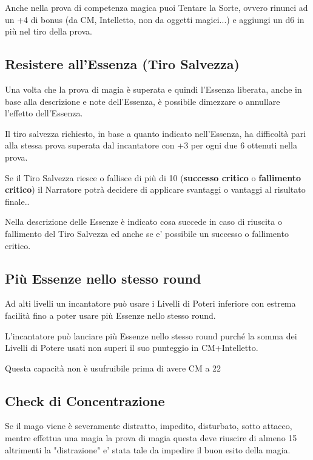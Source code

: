 \documentclass[a4paper,11pt,twoside,openany]{book}
\begin{document}
Anche nella prova di competenza magica puoi Tentare la Sorte, ovvero rinunci ad un +4 di bonus (da CM, Intelletto, non da oggetti magici...) e aggiungi un d6 in più nel tiro della prova.

\subsection{Resistere all'Essenza (Tiro Salvezza)}

\label{resistere-allessenza-tiro-salvezza}

Una volta che la prova di magia è superata e quindi l'Essenza liberata, anche in base alla descrizione e note dell'Essenza, è possibile dimezzare o annullare l'effetto dell'Essenza.

Il tiro salvezza richiesto, in base a quanto indicato nell'Essenza, ha difficoltà pari alla stessa prova superata dal incantatore con +3 per ogni due 6 ottenuti nella prova.

Se il Tiro Salvezza riesce o fallisce di più di 10 (\textbf{successo critico} o \textbf{fallimento critico}) il Narratore potrà decidere di applicare svantaggi o vantaggi al risultato finale..

Nella descrizione delle Essenze è indicato cosa succede in caso di riuscita o fallimento del Tiro Salvezza ed anche se e' possibile un successo o fallimento critico.

\subsection{Più Essenze nello stesso round}

Ad alti livelli un incantatore può usare i Livelli di Poteri inferiore con estrema facilità fino a poter usare più Essenze nello stesso round.

L'incantatore può lanciare più Essenze nello stesso round purché la somma dei Livelli di Potere usati non superi il suo punteggio in CM+Intelletto.

Questa capacità non è usufruibile prima di avere CM a 22

\subsection{Check di Concentrazione}

Se il mago viene è severamente distratto, impedito, disturbato, sotto attacco, mentre effettua una magia la prova di magia questa deve riuscire di almeno 15 altrimenti la "distrazione" e' stata tale da impedire il buon esito della magia.
\end{document}
